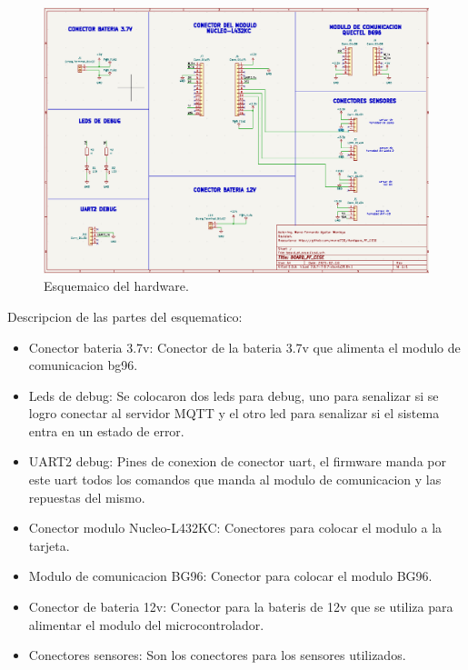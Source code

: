 \begin{figure}[htbp]
  \centering
	\includegraphics[width=20cm, height=\textwidth, angle=90]{./Figures/esquematico.png}
	\caption{Esquemaico del hardware.}
	\label{fig:esquematico}
\end{figure}

Descripcion de las partes del esquematico: 

\begin{itemize}
  \item Conector bateria 3.7v: Conector de la bateria 3.7v que alimenta el modulo de comunicacion bg96.
  \item Leds de debug: Se colocaron dos leds para debug, uno para senalizar si se logro conectar al servidor MQTT y el otro led para senalizar si el sistema entra en un estado de error.
  \item UART2 debug: Pines de conexion de conector uart, el firmware manda por este uart todos los comandos que manda al modulo de comunicacion y las repuestas del mismo.
  \item Conector modulo Nucleo-L432KC: Conectores para colocar el modulo a la tarjeta.
  \item Modulo de comunicacion BG96: Conector para colocar el modulo BG96.
  \item Conector de bateria 12v: Conector para la bateris de 12v que se utiliza para alimentar el modulo del microcontrolador.
  \item Conectores sensores: Son los conectores para los sensores utilizados.  
\end{itemize}

